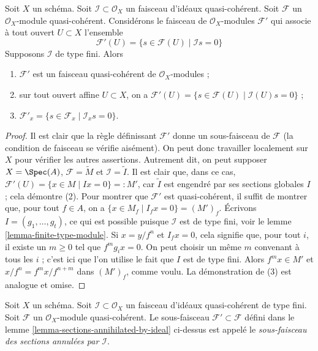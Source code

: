 \begin{lemma}
\label{lemma-sections-annihilated-by-ideal}
Soit $X$ un schéma.
Soit $\mathcal{I} \subset \mathcal{O}_X$ un faisceau d'idéaux quasi-cohérent.
Soit $\mathcal{F}$ un $\mathcal{O}_X$-module quasi-cohérent.
Considérons le faisceau de $\mathcal{O}_X$-modules $\mathcal{F}'$
qui associe à tout ouvert $U \subset X$ l'ensemble
$$
\mathcal{F}'(U)
=
\{s \in \mathcal{F}(U) \mid
\mathcal{I}s = 0\}
$$
Supposons $\mathcal{I}$ de type fini. Alors
\begin{enumerate}
\item $\mathcal{F}'$ est un faisceau quasi-cohérent de $\mathcal{O}_X$-modules ;
\item sur tout ouvert affine $U \subset X$, on a
$\mathcal{F}'(U) = \{s \in \mathcal{F}(U) \mid \mathcal{I}(U)s = 0\}$ ;
\item $\mathcal{F}'_x = \{s \in \mathcal{F}_x \mid \mathcal{I}_x s = 0\}$.
\end{enumerate}
\end{lemma}

\begin{proof}
Il est clair que la règle définissant $\mathcal{F}'$ donne un sous-faisceau
de $\mathcal{F}$ (la condition de faisceau se vérifie aisément). On peut donc
travailler localement sur $X$ pour vérifier les autres assertions. Autrement dit,
on peut supposer $X = \Spec(A)$, $\mathcal{F} = \widetilde{M}$
et $\mathcal{I} = \widetilde{I}$. Il est clair que, dans ce cas,
$\mathcal{F}'(U) = \{x \in M \mid Ix = 0\} =: M'$, car $\widetilde{I}$
est engendré par ses sections globales $I$ ; cela démontre (2).
Pour montrer que $\mathcal{F}'$ est quasi-cohérent, il suffit de montrer que,
pour tout $f \in A$, on a
$\{x \in M_f \mid I_f x = 0\} = (M')_f$.
Écrivons $I = (g_1, \ldots, g_t)$, ce qui est possible puisque $\mathcal{I}$
est de type fini, voir le lemme \ref{lemma-finite-type-module}.
Si $x = y/f^n$ et $I_fx = 0$, cela signifie que, pour tout $i$,
il existe un $m \geq 0$ tel que $f^mg_ix = 0$.
On peut choisir un même $m$ convenant à tous les $i$ ; c'est ici que l'on
utilise le fait que $I$ est de type fini. Alors $f^mx \in M'$
et $x/f^n = f^mx/f^{n + m}$ dans $(M')_f$, comme voulu.
La démonstration de (3) est analogue et omise.
\end{proof}

\begin{definition}
\label{definition-subsheaf-sections-annihilated-by-ideal}
Soit $X$ un schéma.
Soit $\mathcal{I} \subset \mathcal{O}_X$ un faisceau d'idéaux quasi-cohérent
de type fini.
Soit $\mathcal{F}$ un $\mathcal{O}_X$-module quasi-cohérent.
Le sous-faisceau $\mathcal{F}' \subset \mathcal{F}$ défini dans le
lemme \ref{lemma-sections-annihilated-by-ideal} ci-dessus est appelé
le {\it sous-faisceau des sections annulées par $\mathcal{I}$}.
\end{definition}

